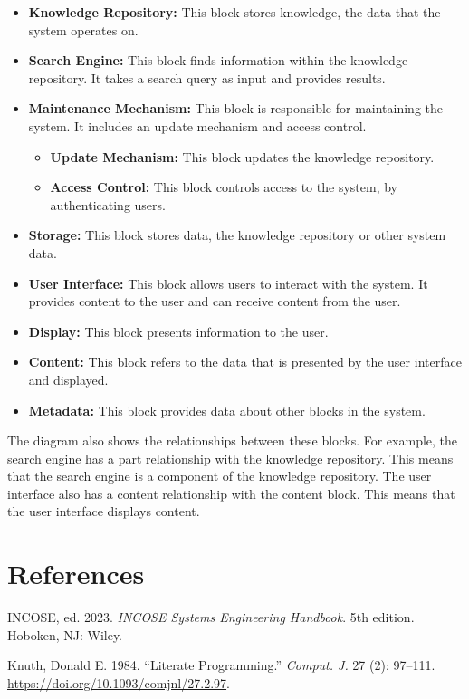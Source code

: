 \documentclass[
  letterpaper,
  DIV=11,
  numbers=noendperiod]{scrreprt}
\newlength{\cslhangindent}
\newenvironment{CSLReferences}[2] %
 {\begin{list}{}{%
  \setlength{\itemindent}{0pt}
  \setlength{\leftmargin}{0pt}
  \setlength{\parsep}{0pt}
  \ifodd #1
   \setlength{\leftmargin}{\cslhangindent}
   \setlength{\itemindent}{-1\cslhangindent}
  \fi
  \setlength{\itemsep}{#2\baselineskip}}}
 {\end{list}}
\begin{document}
\begin{itemize}
\item
  \textbf{Knowledge Repository:} This block stores knowledge, the data
  that the system operates on.
\item
  \textbf{Search Engine:} This block finds information within the
  knowledge repository. It takes a search query as input and provides
  results.
\item
  \textbf{Maintenance Mechanism:} This block is responsible for
  maintaining the system. It includes an update mechanism and access
  control.

  \begin{itemize}
  \item
    \textbf{Update Mechanism:} This block updates the knowledge
    repository.
  \item
    \textbf{Access Control:} This block controls access to the system,
    by authenticating users.
  \end{itemize}
\item
  \textbf{Storage:} This block stores data, the knowledge repository or
  other system data.
\item
  \textbf{User Interface:} This block allows users to interact with the
  system. It provides content to the user and can receive content from
  the user.
\item
  \textbf{Display:} This block presents information to the user.
\item
  \textbf{Content:} This block refers to the data that is presented by
  the user interface and displayed.
\item
  \textbf{Metadata:} This block provides data about other blocks in the
  system.
\end{itemize}

The diagram also shows the relationships between these blocks. For
example, the search engine has a part relationship with the knowledge
repository. This means that the search engine is a component of the
knowledge repository. The user interface also has a content relationship
with the content block. This means that the user interface displays
content.


\chapter*{References}\label{references}


\label{refs}
\begin{CSLReferences}{1}{0}
INCOSE, ed. 2023. \emph{{INCOSE} Systems Engineering Handbook}. 5th
edition. Hoboken, {NJ}: Wiley.

Knuth, Donald E. 1984. {``Literate Programming.''} \emph{Comput. J.} 27
(2): 97--111. \url{https://doi.org/10.1093/comjnl/27.2.97}.

\end{CSLReferences}
\end{document}
